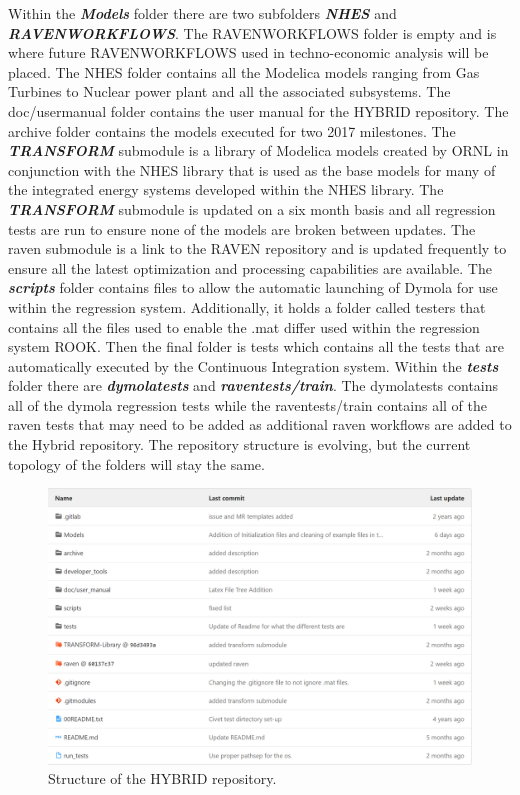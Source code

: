 Within the \textbf{\textit{Models}} folder there are two subfolders \textbf{\textit{NHES}} and \textbf{\textit{RAVEN\textunderscore WORKFLOWS}}. The RAVEN\textunderscore WORKFLOWS folder is empty and is where future RAVEN\textunderscore WORKFLOWS used in techno-economic analysis will be placed. The NHES folder contains all the Modelica models ranging from Gas Turbines to Nuclear power plant and all the associated subsystems. The doc/user\textunderscore manual folder contains the user manual for the HYBRID repository. The archive folder contains the models executed for two 2017 milestones. The \textbf{\textit{TRANSFORM}} submodule is a library of Modelica models created by ORNL in conjunction with the NHES library that is used as the base models for many of the integrated energy systems developed within the NHES library. The \textbf{\textit{TRANSFORM}} submodule is updated on a six month basis and all regression tests are run to ensure none of the models are broken between updates. The raven submodule is a link to the RAVEN repository and is updated frequently to ensure all the latest optimization and processing capabilities are available. The \textbf{\textit{scripts}} folder contains files to allow the automatic launching of Dymola for use within the regression system. Additionally, it holds a folder called testers that contains all the files used to enable the .mat differ used within the regression system ROOK. Then the final folder is tests which contains all the tests that are automatically executed by the Continuous Integration system. Within the \textbf{\textit{tests}} folder there are \textbf{\textit{dymola\textunderscore tests}} and \textbf{\textit{raven\textunderscore tests/train}}. The dymola\textunderscore tests contains all of the dymola regression tests while the raven\textunderscore tests/train contains all of the raven tests that may need to be added as additional raven workflows are added to the Hybrid repository. The repository structure is evolving, but the current topology of the folders will stay the same. 
\begin{figure}[hbtp]
\centering
\includegraphics[scale=0.4]{pics/Repository_Structure.png}
\caption{Structure of the HYBRID repository.}
\end{figure}

